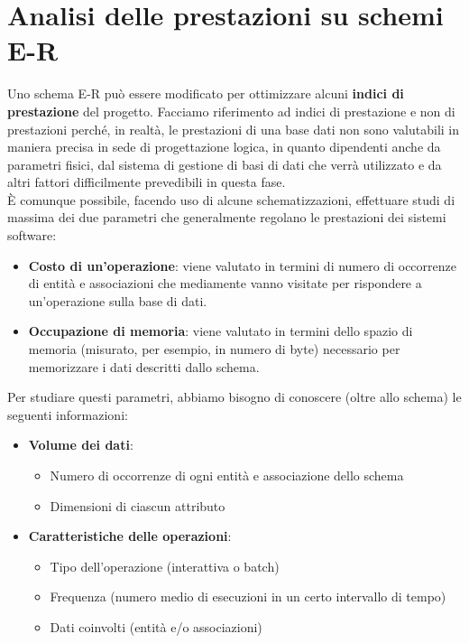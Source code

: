 \section{Analisi delle prestazioni su schemi E-R}
Uno schema E-R può essere modificato per ottimizzare alcuni \textbf{indici di prestazione} del progetto. Facciamo riferimento ad indici di prestazione e non di prestazioni perché, in realtà, le prestazioni di una base dati non sono valutabili in maniera precisa in sede di progettazione logica, in quanto dipendenti anche da parametri fisici, dal sistema di gestione di basi di dati che verrà utilizzato e da altri fattori difficilmente prevedibili in questa fase.\\
È comunque possibile, facendo uso di alcune schematizzazioni, effettuare studi di massima dei due parametri che generalmente regolano le prestazioni dei sistemi software:  
    \begin{itemize}
        \item{\textbf{Costo di un'operazione}: viene valutato in termini di numero di occorrenze di entità e associazioni che mediamente vanno visitate per rispondere a un'operazione sulla base di dati.}
        \item{\textbf{Occupazione di memoria}: viene valutato in termini dello spazio di memoria (misurato, per esempio, in numero di byte) necessario per memorizzare i dati descritti dallo schema.}
    \end{itemize}
Per studiare questi parametri, abbiamo bisogno di conoscere (oltre allo schema) le seguenti informazioni:
    \begin{itemize}
        \item{\textbf{Volume dei dati}:
            \begin{itemize}
                \item{Numero di occorrenze di ogni entità e associazione dello schema}
                \item{Dimensioni di ciascun attributo}
            \end{itemize}}
        \item{\textbf{Caratteristiche delle operazioni}:
            \begin{itemize}
                \item{Tipo dell'operazione (interattiva o batch)}
                \item{Frequenza (numero medio di esecuzioni in un certo intervallo di tempo)}
                \item{Dati coinvolti (entità e/o associazioni)}
            \end{itemize}}
    \end{itemize}
